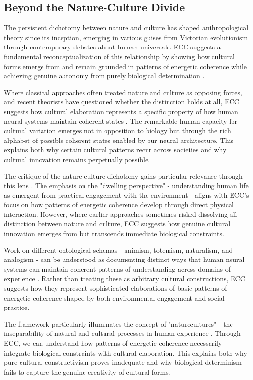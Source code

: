 \subsection{Beyond the Nature-Culture Divide}

The persistent dichotomy between nature and culture has shaped anthropological theory since its inception, emerging in various guises from Victorian evolutionism through contemporary debates about human universals. ECC suggests a fundamental reconceptualization of this relationship by showing how cultural forms emerge from and remain grounded in patterns of energetic coherence while achieving genuine autonomy from purely biological determination \cite{descola2005beyond}.

Where classical approaches often treated nature and culture as opposing forces, and recent theorists have questioned whether the distinction holds at all, ECC suggests how cultural elaboration represents a specific property of how human neural systems maintain coherent states \cite{latour1993modern}. The remarkable human capacity for cultural variation emerges not in opposition to biology but through the rich alphabet of possible coherent states enabled by our neural architecture. This explains both why certain cultural patterns recur across societies and why cultural innovation remains perpetually possible.

The critique of the nature-culture dichotomy gains particular relevance through this lens \cite{ingold2000perception}. The emphasis on the "dwelling perspective" - understanding human life as emergent from practical engagement with the environment - aligns with ECC's focus on how patterns of energetic coherence develop through direct physical interaction. However, where earlier approaches sometimes risked dissolving all distinction between nature and culture, ECC suggests how genuine cultural innovation emerges from but transcends immediate biological constraints.

Work on different ontological schemas - animism, totemism, naturalism, and analogism - can be understood as documenting distinct ways that human neural systems can maintain coherent patterns of understanding across domains of experience \cite{descola2005beyond}. Rather than treating these as arbitrary cultural constructions, ECC suggests how they represent sophisticated elaborations of basic patterns of energetic coherence shaped by both environmental engagement and social practice.

The framework particularly illuminates the concept of "naturecultures" - the inseparability of natural and cultural processes in human experience \cite{haraway2003companion}. Through ECC, we can understand how patterns of energetic coherence necessarily integrate biological constraints with cultural elaboration. This explains both why pure cultural constructivism proves inadequate and why biological determinism fails to capture the genuine creativity of cultural forms.

